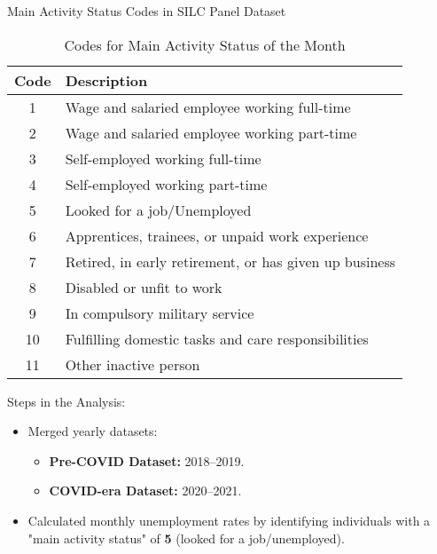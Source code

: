 \documentclass[
	11pt, %
]{beamer}
\begin{document}
\begin{frame}{Main Activity Status Codes in SILC Panel Dataset}
    \begin{table}[]
        \centering
        \begin{tabular}{|c|l|}
            \hline
            \textbf{Code} & \textbf{Description} \\ \hline
            1             & Wage and salaried employee working full-time \\ \hline
            2             & Wage and salaried employee working part-time \\ \hline
            3             & Self-employed working full-time \\ \hline
            4             & Self-employed working part-time \\ \hline
            5             & Looked for a job/Unemployed \\ \hline
            6             & Apprentices, trainees, or unpaid work experience \\ \hline
            7             & Retired, in early retirement, or has given up business \\ \hline
            8             & Disabled or unfit to work \\ \hline
            9             & In compulsory military service \\ \hline
            10            & Fulfilling domestic tasks and care responsibilities \\ \hline
            11            & Other inactive person \\ \hline
        \end{tabular}
        \caption{Codes for Main Activity Status of the Month}
        \label{tab:activity_status}
    \end{table}
\end{frame}

\begin{frame}{Steps in the Analysis:}
    \begin{itemize}
        \item Merged yearly datasets:
        \begin{itemize}
            \item \textbf{Pre-COVID Dataset:} 2018–2019.
            \item \textbf{COVID-era Dataset:} 2020–2021.
        \end{itemize}
        \item Calculated monthly unemployment rates by identifying individuals with a "main activity status" of \textbf{5} (looked for a job/unemployed).
    \end{itemize}
\end{frame}
\end{document}
